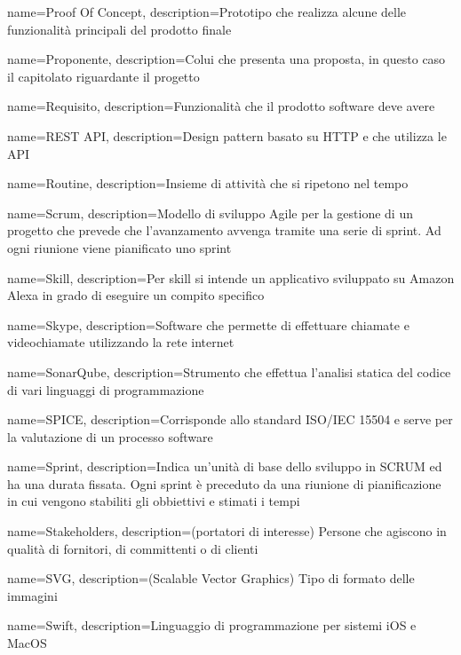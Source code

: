 {
	name={Proof Of Concept},
	description={Prototipo che realizza alcune delle funzionalità principali del prodotto finale}
}

{
	name={Proponente},
	description={Colui che presenta una proposta, in questo caso il capitolato riguardante il progetto}
	{\newpage}
}

{
	name={Requisito},
	description={Funzionalità che il prodotto software deve avere}
}

{
	name={REST API},
	description={Design pattern basato su HTTP e che utilizza le API}
}

{
	name={Routine},
	description={Insieme di attività che si ripetono nel tempo}
	{\newpage}
}

{
	name={Scrum},
	description={Modello di sviluppo Agile per la gestione di un progetto che prevede che l’avanzamento avvenga tramite una serie di sprint. Ad ogni riunione viene pianificato uno sprint}
}

{
	name={Skill},
	description={Per skill si intende un applicativo sviluppato su Amazon Alexa in grado di eseguire un compito specifico}
}

{
	name={Skype},
	description={Software che permette di effettuare chiamate e videochiamate utilizzando la rete internet}
}

{
	name={SonarQube},
	description={Strumento che effettua l’analisi statica del codice di vari linguaggi di programmazione}
}

{
	name={SPICE},
	description={Corrisponde allo standard ISO/IEC 15504 e serve per la valutazione di un processo software}
}

{
	name={Sprint},
	description={Indica un’unità di base dello sviluppo in SCRUM ed ha una durata fissata. Ogni sprint è preceduto da una riunione di pianificazione in cui vengono stabiliti gli obbiettivi e stimati i tempi}
}

{
	name={Stakeholders},
	description={(portatori di interesse) Persone che agiscono in qualità di fornitori, di committenti o di clienti}
}

{
	name={SVG},
	description={(Scalable Vector Graphics) Tipo di formato delle immagini}
}

{
	name={Swift},
	description={Linguaggio di programmazione per sistemi iOS e MacOS}
	{\newpage}
}

